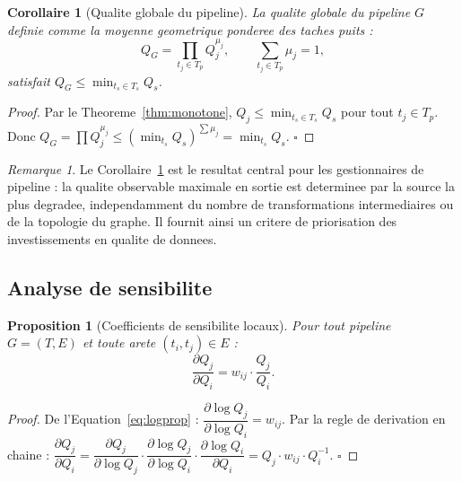 \documentclass[12pt,a4paper]{article}
\theoremstyle{plain}
\newtheorem{proposition}[theorem]{Proposition}
\newtheorem{corollary}[theorem]{Corollaire}
\theoremstyle{definition}
\theoremstyle{remark}
\newtheorem{remark}[theorem]{Remarque}
\begin{document}
	\begin{corollary}[Qualite globale du pipeline]
		\label{cor:global}
		La qualite globale du pipeline $G$ definie comme la moyenne geometrique
		ponderee des taches puits :
		\begin{equation}
			Q_G = \prod_{t_j \in T_p} Q_j^{\mu_j},
			\qquad \sum_{t_j\in T_p}\mu_j = 1,
			\label{eq:qglobal}
		\end{equation}
		satisfait $Q_G \leq \min_{t_s \in T_s} Q_s$.
	\end{corollary}
	
	\begin{proof}
		Par le Theoreme~\ref{thm:monotone}, $Q_j \leq \min_{t_s\in T_s} Q_s$
		pour tout $t_j \in T_p$. Donc
		$Q_G = \prod Q_j^{\mu_j} \leq (\min_{t_s}Q_s)^{\sum\mu_j}
		= \min_{t_s}Q_s$. \hfill$\square$
	\end{proof}
	
	\begin{remark}
		Le Corollaire~\ref{cor:global} est le resultat central pour les
		gestionnaires de pipeline : la qualite observable maximale en sortie
		est determinee par la source la plus degradee, independamment du nombre
		de transformations intermediaires ou de la topologie du graphe.
		Il fournit ainsi un critere de priorisation des investissements en
		qualite de donnees.
	\end{remark}
	
	\subsection{Analyse de sensibilite}
	\label{subsec:sensitivity}
	
	\begin{proposition}[Coefficients de sensibilite locaux]
		\label{prop:sensitivity}
		Pour tout pipeline $G=(T,E)$ et toute arete $(t_i,t_j) \in E$ :
		\begin{equation}
			\frac{\partial Q_j}{\partial Q_i} = w_{ij} \cdot \frac{Q_j}{Q_i}.
			\label{eq:sens_local}
		\end{equation}
	\end{proposition}
	
	\begin{proof}
		De l'Equation~\eqref{eq:logprop} :
		$\dfrac{\partial \log Q_j}{\partial \log Q_i} = w_{ij}$.
		Par la regle de derivation en chaine :
		$\dfrac{\partial Q_j}{\partial Q_i}
		= \dfrac{\partial Q_j}{\partial \log Q_j}
		\cdot \dfrac{\partial \log Q_j}{\partial \log Q_i}
		\cdot \dfrac{\partial \log Q_i}{\partial Q_i}
		= Q_j \cdot w_{ij} \cdot Q_i^{-1}$.
		\hfill$\square$
	\end{proof}
	
\end{document}

